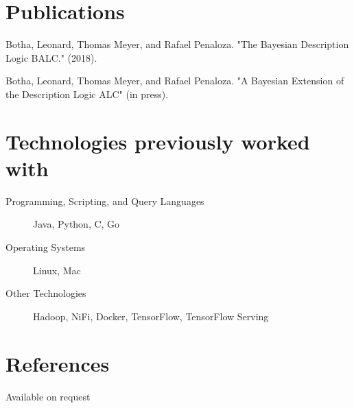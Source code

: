 \documentclass[margin,line,a4paper]{resume}
\begin{document}
\begin{resume}
\begin{description}
            \end{description}
        
        \section{\mysidestyle Publications}    
            \begin{description}
                \item Botha, Leonard, Thomas Meyer, and Rafael Penaloza. "The Bayesian Description Logic BALC." (2018).
                \item Botha, Leonard, Thomas Meyer, and Rafael Penaloza. "A Bayesian Extension of the Description Logic ALC" (in press).
            \end{description}

        \section{\mysidestyle Technologies previously worked with}
        	\begin{description}
	        	\item [Programming, Scripting, and Query Languages] Java, Python, C, Go
	 			\item [Operating Systems] Linux, Mac
	 			\item [Other Technologies] Hadoop, NiFi, Docker, TensorFlow, TensorFlow Serving
	 		\end{description}

       	\section{\mysidestyle References}
            Available on request
    \end{resume}
\end{document}
